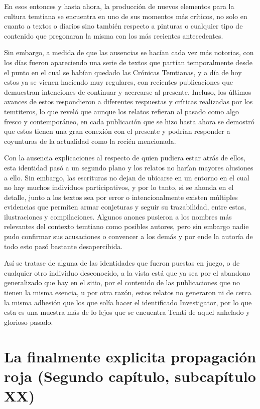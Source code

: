 \documentclass[
  spanish,
]{book}
\begin{document}
En esos entonces y hasta ahora, la producción de nuevos elementos para la cultura temtiana se encuentra en uno de sus momentos más críticos, no solo en cuanto a textos o diarios sino también respecto a pinturas o cualquier tipo de contenido que pregonaran la misma con los más recientes antecedentes.

Sin embargo, a medida de que las ausencias se hacían cada vez más notorias, con los días fueron apareciendo una serie de textos que partían temporalmente desde el punto en el cual se habían quedado las Crónicas Temtianas, y a día de hoy estos ya se vienen haciendo muy regulares, con recientes publicaciones que demuestran intenciones de continuar y acercarse al presente. Incluso, los últimos avances de estos respondieron a diferentes respuestas y críticas realizadas por los temtiteros, lo que reveló que aunque los relatos refieran al pasado como algo fresco y contemporáneo, en cada publicación que se hizo hasta ahora se demostró que estos tienen una gran conexión con el presente y podrían responder a coyunturas de la actualidad como la recién mencionada.

Con la ausencia explicaciones al respecto de quien pudiera estar atrás de ellos, esta identidad pasó a un segundo plano y los relatos no harían mayores alusiones a ello. Sin embargo, las escrituras no dejan de ubicarse en un entorno en el cual no hay muchos individuos participativos, y por lo tanto, si se ahonda en el detalle, junto a los textos sea por error o intencionalmente existen múltiples evidencias que permiten armar conjeturas y seguir su trazabilidad, entre estas, ilustraciones y compilaciones. Algunos anones pusieron a los nombres más relevantes del contexto temtiano como posibles autores, pero sin embargo nadie pudo confirmar sus acusaciones o convencer a los demás y por ende la autoría de todo esto pasó bastante desapercibida.

Así se tratase de alguna de las identidades que fueron puestas en juego, o de cualquier otro individuo desconocido, a la vista está que ya sea por el abandono generalizado que hay en el sitio, por el contenido de las publicaciones que no tienen la misma esencia, u por otra razón, estos relatos no generaron ni de cerca la misma adhesión que los que solía hacer el identificado Investigator, por lo que esta es una muestra más de lo lejos que se encuentra Temti de aquel anhelado y glorioso pasado.

\hypertarget{la-finalmente-explicita-propagaciuxf3n-roja-segundo-capuxedtulo-subcapuxedtulo-xx}{%
\section{La finalmente explicita propagación roja (Segundo capítulo, subcapítulo XX)}\label{la-finalmente-explicita-propagaciuxf3n-roja-segundo-capuxedtulo-subcapuxedtulo-xx}}
\end{document}
